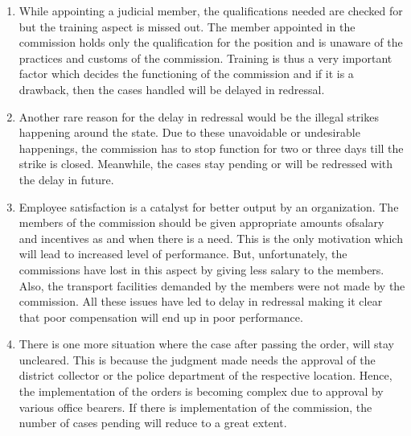 \begin{multicols}{2}
\begin{enumerate}[label=$\bullet$]
\item While appointing a judicial member, the qualifications needed are checked for but the
training aspect is missed out. The member appointed in the commission holds only the
qualification for the position and is unaware of the practices and customs of the
commission. Training is thus a very important factor which decides the functioning of
the commission and if it is a drawback, then the cases handled will be delayed in
redressal.

\item Another rare reason for the delay in redressal would be the illegal strikes happening
around the state. Due to these unavoidable or undesirable happenings, the commission
has to stop function for two or three days till the strike is closed. Meanwhile, the cases
stay pending or will be redressed with the delay in future.

\item Employee satisfaction is a catalyst for better output by an organization. The members
of the commission should be given appropriate amounts ofsalary and incentives as and
when there is a need. This is the only motivation which will lead to increased level of
performance. But, unfortunately, the commissions have lost in this aspect by giving less
salary to the members. Also, the transport facilities demanded by the members were not made by the commission. All these issues have led to delay in redressal making it clear
that poor compensation will end up in poor performance.

\item There is one more situation where the case after passing the order, will stay uncleared.
This is because the judgment made needs the approval of the district collector or the
police department of the respective location. Hence, the implementation of the orders
is becoming complex due to approval by various office bearers. If there is
implementation of the commission, the number of cases pending will reduce to a great
extent.
\end{enumerate}

\vspace{-.5cm}


\end{multicols}
